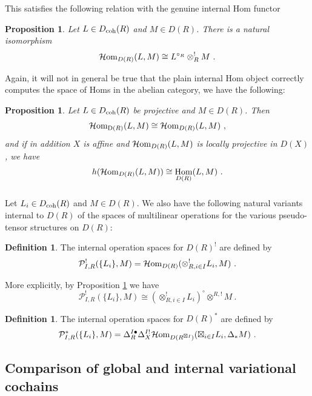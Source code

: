 \documentclass[11pt]{amsart}
\numberwithin{equation}{section}
\newtheorem{prop}[theo]{Proposition}
\theoremstyle{definition}
\newtheorem{defn}[theo]{Definition}
\newcommand{\mc}{\mathcal}
\DeclareMathOperator{\Hom}{Hom}
\newcommand{\Homi}{{\mc H\textup{om}}}
\newcommand{\coh}{{\textup{coh}}}
\newcommand{\0}{{\textbf{0}}}
\newcommand{\Dd}{{\textup{D}}}
\newcommand{\DD}{{D}}
\begin{document}
This satisfies the following relation with the genuine internal Hom functor
\begin{prop}\label{Rinthomdescprop} Let $L\in \DD_\coh(R)$ and $M\in \DD(R)$. There is a natural isomorphism
	\[\Homi_{\DD(R)}(L,M)  \cong L^{\circ_R} \otimes^!_R M \ . \]
\end{prop}


Again, it will not in general be true that the plain internal Hom object correctly computes the space of Homs in the abelian category, we have the following:

\begin{prop}\label{inthommatchabprop} Let $L\in \DD_\coh(R)$ be projective and $M\in \DD(R)$. Then
	\[ \Homi_{\Dd(R)}(L,M) \cong \Homi_{\DD(R)}(L,M) \ ,\]
	and if in addition $X$ is affine and $\Homi_{\DD(R)}(L,M)$ is locally projective in $\DD(X)$, we have
	\[ h(\Homi_{\DD(R)}(L,M)) \cong  \Hom_{\DD(R)}(L,M)  \ .\]
\end{prop}






\subsubsection{}Let $L_i \in \DD_\coh(R)$ and $M\in \DD(R)$. We also have the following natural variants internal to $\DD(R)$ of the spaces of multilinear operations for the various pseudo-tensor structures on $\DD(R)$:

\begin{defn} The internal operation spaces for $\DD(R)^!$ are defined by
	\[ \mc P^!_{I,R}(\{L_i\},M) = \Homi_{\DD(R)}( \otimes_{R,i\in I}^{!} L_i, M)  \  .  \]
\end{defn}

More explicitly, by Proposition \ref{Rinthomdescprop} we have
\[  \mc P^!_{I,R}(\{L_i\},M) \cong (\otimes_{R,i\in I}^{!} L_i )^\circ \otimes^{R,!} M \ . \]

\begin{defn} \label{Rstarinthomdefn}
The internal operation spaces for $\DD(R)^*$ are defined by
	\[ \mc P_{I,R}^*(\{L_i\},M)= \Delta_R^{I\bullet} \Delta^{I!}_X \Homi_{\DD(R^{\boxtimes I })}(\boxtimes_{i\in I} L_i, \Delta_*M) \ . \]
\end{defn}










\subsection{Comparison of global and internal variational cochains}\label{intglobalcompsec}
\end{document}
